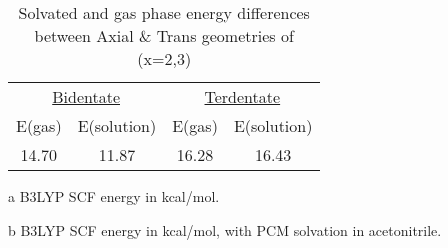 \begin{table}[!h]
\centering
 \begin{threeparttable}
  \caption{Solvated and gas phase energy differences between Axial \& Trans geometries of  (x=2,3)}
    \begin{tabular}{cccc}
    \toprule
    \multicolumn{2}{c}{\underline{Bidentate}} & \multicolumn{2}{c}{\underline{Terdentate}} \\
    E(gas)\tnote{a} & E(solution)\tnote{b} & E(gas)\tnote{a} & E(solution)\tnote{b} \\ \midrule
    14.70 & 11.87 & 16.28 & 16.43 \\
    \bottomrule
    \end{tabular}%
    \begin{tablenotes}
    \item [a] B3LYP SCF energy in kcal/mol.
    \item [b] B3LYP SCF energy in kcal/mol, with PCM solvation in acetonitrile.
    \end{tablenotes}
  \label{tab.cneng}%
 \end{threeparttable}
\end{table}%


